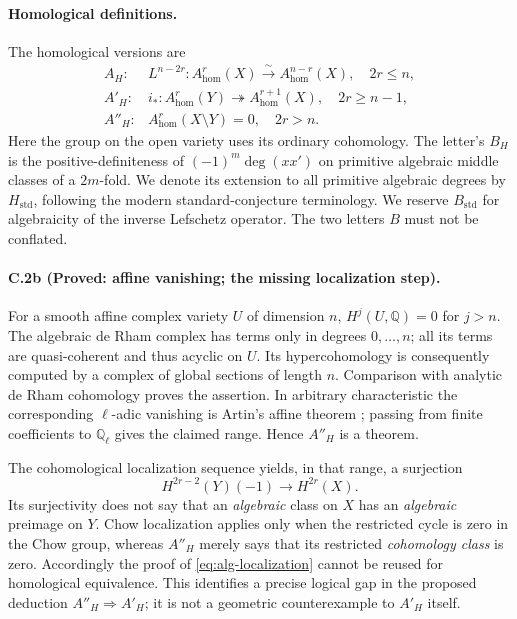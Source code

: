 \paragraph{Homological definitions.}
The homological versions are
\[
\begin{array}{ll}
A_H:& L^{n-2r}:A^r_{\mathrm{hom}}(X)\xrightarrow{\sim}
                  A^{n-r}_{\mathrm{hom}}(X),\quad 2r\le n,\\
A'_H:&i_*:A^r_{\mathrm{hom}}(Y)\twoheadrightarrow
                  A^{r+1}_{\mathrm{hom}}(X),\quad 2r\ge n-1,\\
A''_H:&A^r_{\mathrm{hom}}(X\setminus Y)=0,\quad 2r>n.
\end{array}
\]
Here the group on the open variety uses its ordinary cohomology.
The letter's $B_H$ is the positive-definiteness of
$(-1)^m\deg(xx')$ on primitive algebraic middle classes of a
$2m$-fold. We denote its extension to all primitive algebraic degrees
by $H_{\mathrm{std}}$, following the modern standard-conjecture
terminology. We reserve $B_{\mathrm{std}}$ for algebraicity of the inverse
Lefschetz operator. The two letters $B$ must not be conflated.

\paragraph{C.2b (Proved: affine vanishing; the missing localization step).}
For a smooth affine complex variety $U$ of dimension $n$,
$H^j(U,\mathbb Q)=0$ for $j>n$. The algebraic de Rham complex has terms
only in degrees $0,\ldots,n$; all its terms are quasi-coherent and thus
acyclic on $U$. Its hypercohomology is consequently computed by a complex
of global sections of length $n$. Comparison with analytic de Rham
cohomology proves the assertion. In arbitrary characteristic the
corresponding $\ell$-adic vanishing is Artin's affine theorem
\citep[Expos\'e XIV, Corollaire 3.2]{cySGA4XIV}; passing from finite
coefficients to $\mathbb Q_\ell$ gives the claimed range. Hence $A''_H$
is a theorem.

The cohomological localization sequence yields, in that range, a
surjection
\[
 H^{2r-2}(Y)(-1)\longrightarrow H^{2r}(X).
\]
Its surjectivity does not say that an \emph{algebraic} class on $X$ has
an \emph{algebraic} preimage on $Y$. Chow localization applies only when
the restricted cycle is zero in the Chow group, whereas $A''_H$ merely
says that its restricted \emph{cohomology class} is zero. Accordingly
the proof of \eqref{eq:alg-localization} cannot be reused for homological
equivalence. This identifies a precise logical gap in the proposed
deduction $A''_H\Rightarrow A'_H$; it is not a geometric counterexample
to $A'_H$ itself.


